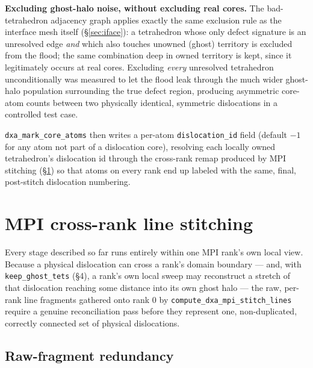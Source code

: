 \documentclass[11pt,a4paper]{article}
\newcommand{\op}[1]{\texttt{#1}}
\newcommand{\field}[1]{\texttt{#1}}
\newcommand{\code}[1]{\texttt{#1}}
\begin{document}
\textbf{Excluding ghost-halo noise, without excluding real cores.} The bad-tetrahedron adjacency
graph applies exactly the same exclusion rule as the interface mesh itself (\S\ref{sec:iface}):
a tetrahedron whose only defect signature is an unresolved edge \emph{and} which also touches
unowned (ghost) territory is excluded from the flood; the same combination deep in owned territory
is kept, since it legitimately occurs at real cores. Excluding \emph{every} unresolved
tetrahedron unconditionally was measured to let the flood leak through the much wider ghost-halo
population surrounding the true defect region, producing asymmetric core-atom counts between two
physically identical, symmetric dislocations in a controlled test case.

\op{dxa\_mark\_core\_atoms} then writes a per-atom \field{dislocation\_id} field (default $-1$ for
any atom not part of a dislocation core), resolving each locally owned tetrahedron's dislocation
id through the cross-rank remap produced by MPI stitching (\S\ref{sec:mpi}) so that atoms on every
rank end up labeled with the same, final, post-stitch dislocation numbering.

\section{MPI cross-rank line stitching}
\label{sec:mpi}

Every stage described so far runs entirely within one MPI rank's own local view. Because a
physical dislocation can cross a rank's domain boundary — and, with \code{keep\_ghost\_tets}
(\S 4), a rank's own local sweep may reconstruct a stretch of that dislocation reaching some
distance into its own ghost halo — the raw, per-rank line fragments gathered onto rank 0 by
\op{compute\_dxa\_mpi\_stitch\_lines} require a genuine reconciliation pass before they represent
one, non-duplicated, correctly connected set of physical dislocations.

\subsection{Raw-fragment redundancy}
\end{document}
